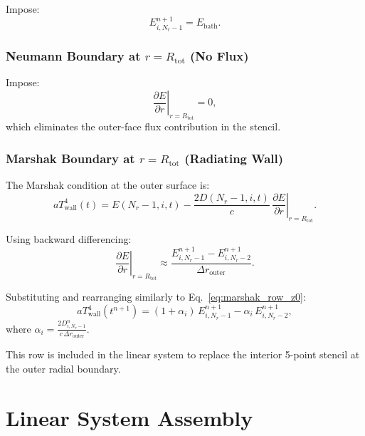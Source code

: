 \documentclass[12pt,oneside]{article}
\begin{document}
Impose:
\begin{equation}
E^{n+1}_{i,N_r-1} = E_{\mathrm{bath}}.
\end{equation}

\subsubsection{Neumann Boundary at $r = R_{\mathrm{tot}}$ (No Flux)}

Impose:
\begin{equation}
\left.\frac{\partial E}{\partial r}\right|_{r=R_{\mathrm{tot}}} = 0,
\end{equation}
which eliminates the outer-face flux contribution in the stencil.

\subsubsection{Marshak Boundary at $r = R_{\mathrm{tot}}$ (Radiating Wall)}

The Marshak condition at the outer surface is:
\begin{equation}
a T_{\mathrm{wall}}^4(t) = E(N_r-1,i,t) - \frac{2D(N_r-1,i,t)}{c}\,\left.\frac{\partial E}{\partial r}\right|_{r=R_{\mathrm{tot}}}.
\end{equation}

Using backward differencing:
\begin{equation}
\left.\frac{\partial E}{\partial r}\right|_{r=R_{\mathrm{tot}}}
\approx
\frac{E_{i,N_r-1}^{n+1} - E_{i,N_r-2}^{n+1}}{\Delta r_{\mathrm{outer}}}.
\end{equation}

Substituting and rearranging similarly to Eq.~\eqref{eq:marshak_row_z0}:
\begin{equation}
\boxed{
a T_{\mathrm{wall}}^4(t^{n+1})
=
(1 + \alpha_i)\,E_{i,N_r-1}^{n+1} - \alpha_i\,E_{i,N_r-2}^{n+1},
}
\label{eq:marshak_row_r_outer}
\end{equation}
where $\alpha_i = \frac{2D^n_{i,N_r-1}}{c\,\Delta r_{\mathrm{outer}}}$.

This row is included in the linear system to replace the interior 5-point stencil at the outer radial boundary.

\section{Linear System Assembly}
\end{document}
